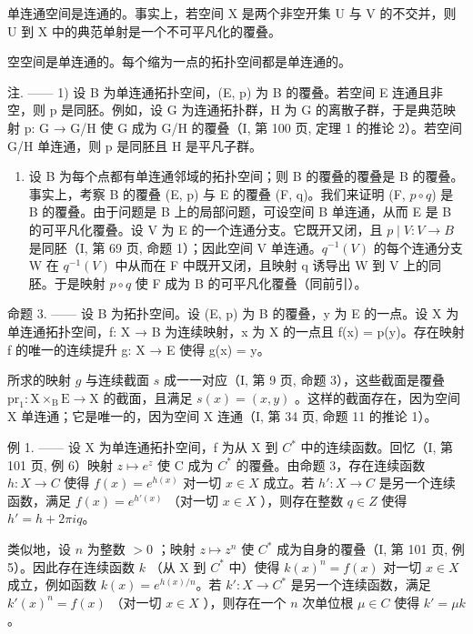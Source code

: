 单连通空间是连通的。事实上，若空间 X 是两个非空开集 U 与 V 的不交并，则 U 到 X 中的典范单射是一个不可平凡化的覆叠。

空空间是单连通的。每个缩为一点的拓扑空间都是单连通的。

注. —— 1) 设 B 为单连通拓扑空间，(E, p) 为 B 的覆叠。若空间 E 连通且非空，则 p 是同胚。例如，设 G 为连通拓扑群，H 为 G 的离散子群，于是典范映射 p: G → G/H 使 G 成为 G/H 的覆叠（I, 第 100 页, 定理 1 的推论 2）。若空间 G/H 单连通，则 p 是同胚且 H 是平凡子群。

\begin{enumerate}
\def\labelenumi{\arabic{enumi})}
\setcounter{enumi}{1}
\tightlist
\item
  设 B 为每个点都有单连通邻域的拓扑空间；则 B 的覆叠的覆叠是 B 的覆叠。事实上，考察 B 的覆叠 (E, p) 与 E 的覆叠 (F, q)。我们来证明 (F, \(p \circ q\)) 是 B 的覆叠。由于问题是 B 上的局部问题，可设空间 B 单连通，从而 E 是 B 的可平凡化覆叠。设 V 为 E 的一个连通分支。它既开又闭，且 \(p \mid V: V \to B\) 是同胚（I, 第 69 页, 命题 1）；因此空间 V 单连通。\(q^{-1}(V)\) 的每个连通分支 W 在 \(q^{-1}(V)\) 中从而在 F 中既开又闭，且映射 q 诱导出 W 到 V 上的同胚。于是映射 \(p \circ q\) 使 F 成为 B 的可平凡化覆叠（同前引）。
\end{enumerate}

命题 3. —— 设 B 为拓扑空间。设 (E, p) 为 B 的覆叠，y 为 E 的一点。设 X 为单连通拓扑空间，f: X → B 为连续映射，x 为 X 的一点且 f(x) = p(y)。存在映射 f 的唯一的连续提升 g: X → E 使得 g(x) = y。

所求的映射 \(g\) 与连续截面 \(s\) 成一一对应（I, 第 9 页, 命题 3），这些截面是覆叠 \(\mathrm{pr}_1: \mathrm{X} \times_{\mathrm{B}} \mathrm{E} \to \mathrm{X}\) 的截面，且满足 \(s(x) = (x, y)\) 。这样的截面存在，因为空间 X 单连通；它是唯一的，因为空间 X 连通（I, 第 34 页, 命题 11 的推论 1）。

例 1. —— 设 X 为单连通拓扑空间，f 为从 X 到 \(C^{*}\) 中的连续函数。回忆（I, 第 101 页, 例 6）映射 \(z \mapsto e^{z}\) 使 C 成为 \(C^{*}\) 的覆叠。由命题 3，存在连续函数 \(h: X \to C\) 使得 \(f(x) = e^{h(x)}\) 对一切 \(x \in X\) 成立。若 \(h': X \to C\) 是另一个连续函数，满足 \(f(x) = e^{h'(x)}\) （对一切 \(x \in X\) ），则存在整数 \(q \in Z\) 使得 \(h' = h + 2\pi iq\)。

类似地，设 \(n\) 为整数 \(>0\) ；映射 \(z \mapsto z^{n}\) 使 \(C^{*}\) 成为自身的覆叠（I, 第 101 页, 例 5）。因此存在连续函数 \(k\) （从 X 到 \(C^{*}\) 中）使得 \(k(x)^{n} = f(x)\) 对一切 \(x \in X\) 成立，例如函数 \(k(x) = e^{h(x)/n}\)。若 \(k' : X \to C^{*}\) 是另一个连续函数，满足 \(k'(x)^{n} = f(x)\) （对一切 \(x \in X\) ），则存在一个 \(n\) 次单位根 \(\mu \in C\) 使得 \(k' = \mu k\)。

